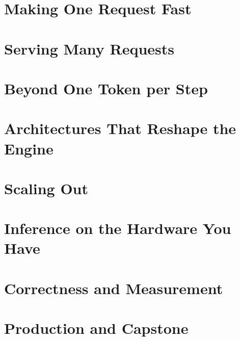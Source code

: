 \documentclass[11pt,oneside,openany]{book}
\begin{document}
\part{Making One Request Fast}\label{part:one-request}







\part{Serving Many Requests}\label{part:serving}








\part{Beyond One Token per Step}\label{part:beyond-one-token}



\part{Architectures That Reshape the Engine}\label{part:architectures}






\part{Scaling Out}\label{part:scaling-out}




\part{Inference on the Hardware You Have}\label{part:hardware-you-have}



\part{Correctness and Measurement}\label{part:correctness}


\part{Production and Capstone}\label{part:production}



\backmatter

\printbibliography[heading=bibintoc,title={References}]
\printindex
\end{document}
